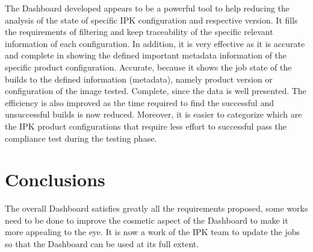 The Dashboard developed appears to be a powerful tool to help reducing the analysis of the state of specific IPK configuration and respective version. It fills the requirements of filtering and keep traceability of the specific relevant information of each configuration. In addition, it is very effective as it is accurate and complete in showing the defined important metadata information of the specific product configuration. Accurate, because it shows the job state of the builds to the defined information (metadata), namely product version or configuration of the image tested. Complete, since the data is well presented. The efficiency is also improved as the time required to find the successful and unsuccessful builds is now reduced. Moreover, it is easier to categorize which are the IPK product configurations that require less effort to successful pass the compliance test during the testing phase. 

\section{Conclusions}

The overall Dashboard satisfies greatly all the requirements proposed, some works need to be done to improve the cosmetic aspect of the Dashboard to make it more appealing to the eye. It is now a work of the IPK team to update the jobs so that the Dashboard can be used at its full extent. 
